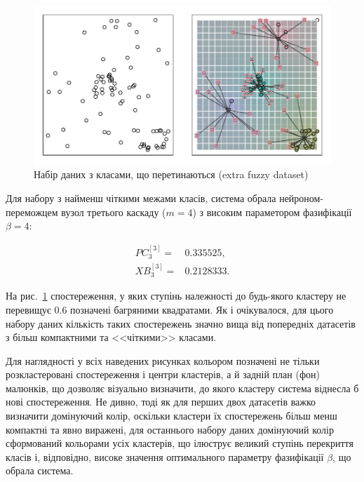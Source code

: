 \documentclass{vakthesis}
\begin{document}
\begin{figure}
\begin{center}
\includegraphics{clustering04.pdf}
\caption{Набір даних з класами, що перетинаються (extra fuzzy dataset)}
\label{fig:clustering04}
\end{center}
\end{figure}

Для набору з найменш чіткими межами класів, система обрала нейроном-переможцем вузол третього каскаду ($m=4$) з високим параметором фазифікації $\beta = 4$:

\begin{equation*}
\begin{aligned}
PC_3^{[3]}=&0.335525,\\
XB_3^{[3]}=&0.2128333.
\end{aligned}
\end{equation*}
\medskip

На рис.~\ref{fig:clustering04} спостереження, у яких ступінь належності до будь-якого кластеру не перевищує $0.6$ позначені багряними квадратами. Як і очікувалося,  для цього набору даних кількість таких спостережень значно вища від попередніх датасетів з більш компактними та <<чіткими>> класами.

Для наглядності у всіх наведених рисунках кольором позначені не тільки розкластеровані спостереження і центри кластерів, а й задній план (фон) малюнків, що дозволяє візуально визначити, до якого кластеру система віднесла б нові спостереження. Не дивно, тоді як для перших двох датасетів важко визначити домінуючий колір, оскільки кластери їх спостережень більш менш компактні та явно виражені, для останнього набору даних домінуючий колір сформований кольорами усіх кластерів, що ілюструє великий ступінь перекриття класів і, відповідно, високе значення оптимального параметру фазифікації $\beta$, що обрала система. 
\end{document}
